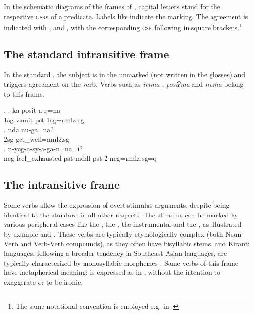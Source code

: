 In the schematic diagrams of the frames of ,  capital letters stand for the respective \textsc{gsr}s of a predicate. Labels like  indicate the  marking. The agreement is indicated with ,  and , with the corresponding \textsc{gsr} following in square brackets.\footnote{The same notational convention is employed  e.g. in \citet{Schikowski2014_Flexible}.} 
 
\subsection{The standard intransitive frame}\label{stand-itr}


\noindent 
In the standard , the subject is in the unmarked   (not written in the glosses) and triggers agreement on the verb. Verbs such as \emph{imma} ,  \emph{posiʔma}  and \emph{numa}  belong to this frame.

\ex. \ag. ka posit-a-ŋ=na\\
		 {\sc 1sg} vomit-{\sc pst-1sg=nmlz.sg}	\\
 	\bg. nda nu-ga=na?\\
	{\sc 2sg}  get\_well{=nmlz.sg}	\\
	\bg. n-yag-a-sy-a-ga-n=na=i?\\ 
{\sc neg}-feel\_exhausted{\sc -pst-mddl-pst-2-neg=nmlz.sg=q}\\

\subsection{The intransitive  frame}\label{itr-exp}


\noindent 
Some  verbs allow the expression of overt stimulus arguments, despite being identical to  the standard  in all other respects. The stimulus can be marked by various peripheral cases like the , the , the instrumental and the , as illustrated by example \Next[a] and \Next[b].  These  verbs are typically etymologically complex (both Noun-Verb and Verb-Verb compounds), as they often have bisyllabic stems, and Kiranti languages, following a broader tendency in Southeast Asian languages, are typically characterized by monosyllabic morphemes \citep{Matisoff1990_Bulging}. Some verbs of this frame have metaphorical meaning:  is expressed as in \Next[c], without the intention to exaggerate or to be ironic. 

